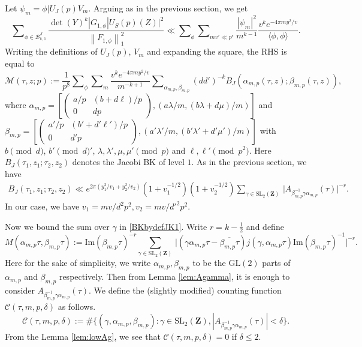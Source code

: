 \documentclass[11pt]{amsart}
\numberwithin{equation}{section}
\theoremstyle{plain}
\theoremstyle{definition}
\newcommand{\mf}{\mathbf}
\newcommand{\mc}{\mathcal}
\newcommand{\mrm}{\mathrm}
\newcommand{\im}{\mrm{Im}}
\newcommand*{\norm}[1]{\left\lVert#1\right\rVert}
\newcommand{\lan}{\langle }
\newcommand{\ran}{\rangle}
\newcommand{\sumn}{\sum \nolimits}
\newcommand{\smat}[4]{\left( \begin{smallmatrix}#1&#2\\#3&#4\end{smallmatrix}\right)}
\newcommand{\sltwo}{\mrm{SL}_2(\mf Z)}
\newcommand{\GL}{\mrm{GL}}
\begin{document}
Let $\psi_m=\phi|U_J(p)V_m$. Arguing as in the previous section, we get
\begin{equation}\label{Upbound-type2}
    \sumn_{\phi\in \mc B_{k,1}^J}\frac{\det(Y)^k |G_{1,\phi}|U_S(p)(Z)|^2}{\norm{F_{1,\phi}}^2_1} \ll \sumn_{\phi}\sumn_{mv'\ll p^\epsilon} \frac{ |\psi_m|^2 }{m^{k-1} } \frac{ v^k e^{- 4 \pi m y^2/v} }{\lan \phi,\phi \ran}.
\end{equation}
Writing the definitions of $U_J(p)$, $V_m$ and expanding the square, the RHS is equal to
\begin{equation}
  \mc M(\tau, z;p):=  \frac{1}{p^8}\sumn_{\phi}\sumn_m \frac{v^{k}e^{-4\pi my^2/v}}{m^{-k+1} }\sumn_{\alpha_{m,p}, \beta_{m,p}} (dd')^{-k} B_J(\alpha_{m,p}(\tau, z);\beta_{m,p}(\tau, z)),
\end{equation}
where $\alpha_{m,p}=[\smat{a/p}{(b+d\ell)/p}{0}{dp}, (a\lambda/m, (b\lambda+d\mu)/m)]$ and $\beta_{m,p}=[\smat{a'/p}{(b'+d'\ell')/p}{0}{d'p}, (a'\lambda'/m, (b'\lambda'+d'\mu')/m)]$ with $b \pmod d$, $b'  \pmod d'$, $\lambda, \lambda',\mu,\mu' \pmod p$ and $\ell ,\ell' \pmod {p^2}$. Here $B_J(\tau_1, z_1; \tau_2,z_2)$ denotes the Jacobi BK of level $1$. As in the previous section, we have
\begin{align}\label{BKbydefJK1}
    B_{J}(\tau_1,z_1;\tau_2,z_2)\ll e^{2 \pi (y_1^2/v_1+y_2^2/v_2)}(1+ v_1^{-1/2})(1+ v_2^{-1/2}) \sum_{ \gamma\in \sltwo} \, \big |A_{\beta_{m,p}^{-1} \gamma \alpha_{m,p}}(\tau)|^{-r}.
\end{align}
In our case, we have $v_1= mv/d^2p^2, v_2= mv/d'^2p^2$.

Now we bound the sum over $\gamma$ in \eqref{BKbydefJK1}. Write $r=k-\frac{1}{2}$ and define
\begin{equation}
    M(\alpha_{m,p}\tau,\beta_{m,p}\tau):= \im(\beta_{m,p}\tau)^{-r}\sum_{ \gamma\in \sltwo} \, \big |(\gamma\alpha_{m,p}\tau-\overline{\beta_{m,p}\tau})j(\gamma,\alpha_{m,p}\tau)\im(\beta_{m,p}\tau)^{-1}\big |^{-r}.
\end{equation}
Here  for the sake of simplicity, we write $\alpha_{m,p}, \beta_{m,p}$ to be the $\GL(2)$ parts of $\alpha_{m,p}$ and $\beta_{m,p}$ respectively. Then from Lemma \ref{lem:Agamma}, it is enough to consider $A_{\beta_{m,p}^{-1}\gamma\alpha_{m,p}}(\tau)$. We define the (slightly modified) counting function $\mc C(\tau, m, p, \delta)$ as follows.
\begin{equation} \label{count-with-wt}
    \mc C(\tau, m,p, \delta):= \#\{(\gamma, \alpha_{m,p}, \beta_{m,p}): \gamma\in \sltwo, |A_{\beta_{m,p}^{-1}\gamma\alpha_{m,p}}(\tau)|< \delta\}.
\end{equation}
From the Lemma \ref{lem:lowAg}, we see that $\mc C(\tau, m,p ,\delta)=0$ if $\delta\le 2$.
\end{document}
